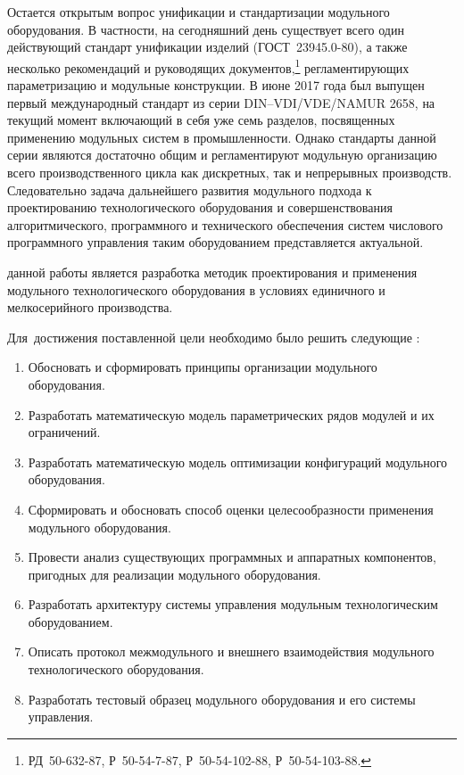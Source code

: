 Остается открытым вопрос унификации и стандартизации модульного оборудования. В частности, на сегодняшний день существует всего один действующий стандарт унификации изделий (ГОСТ~23945.0-80), а также несколько рекомендаций и руководящих документов,\footnote{РД~50-632-87, Р~50-54-7-87, Р~50-54-102-88, Р~50-54-103-88.} регламентирующих параметризацию и модульные конструкции. В июне 2017 года был выпущен первый международный стандарт из серии DIN--VDI/VDE/NAMUR 2658, на текущий момент включающий в себя уже семь разделов, посвященных применению модульных систем в промышленности. Однако стандарты данной серии являются достаточно общим и регламентируют модульную организацию всего производственного цикла как дискретных, так и непрерывных производств. Следовательно задача дальнейшего развития модульного подхода к проектированию технологического оборудования и совершенствования алгоритмического, программного и технического обеспечения систем числового программного управления таким оборудованием представляется актуальной.  


{\aim} данной работы является разработка методик проектирования и применения модульного технологического оборудования в условиях единичного и мелкосерийного производства.

Для~достижения поставленной цели необходимо было решить следующие {\tasks}:
\begin{enumerate}[beginpenalty=10000] %
  \item Обосновать и сформировать принципы организации модульного оборудования.
  \item Разработать математическую модель параметрических рядов модулей и их ограничений.
  \item Разработать математическую модель оптимизации конфигураций модульного оборудования.
  \item Сформировать и обосновать способ оценки целесообразности применения модульного оборудования.
  \item Провести анализ существующих программных и аппаратных компонентов, пригодных для реализации модульного оборудования.
  \item Разработать архитектуру системы управления модульным технологическим оборудованием.
  \item Описать протокол межмодульного и внешнего взаимодействия модульного технологического оборудования.
  \item Разработать тестовый образец модульного оборудования и его системы управления.
\end{enumerate}

